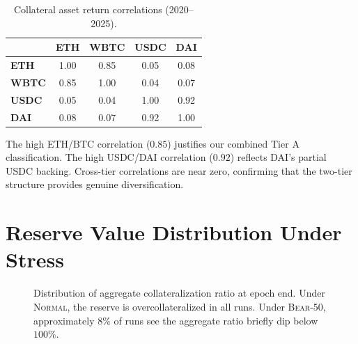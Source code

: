 \documentclass[11pt,a4paper]{article}
\begin{document}
\begin{table}[H]
\centering
\caption{Collateral asset return correlations (2020--2025).}
\label{tab:correlation}
\begin{tabular}{@{}lcccc@{}}
\toprule
         & \textbf{ETH} & \textbf{WBTC} & \textbf{USDC} & \textbf{DAI} \\
\midrule
\textbf{ETH}  & 1.00 & 0.85 & 0.05 & 0.08 \\
\textbf{WBTC} & 0.85 & 1.00 & 0.04 & 0.07 \\
\textbf{USDC} & 0.05 & 0.04 & 1.00 & 0.92 \\
\textbf{DAI}  & 0.08 & 0.07 & 0.92 & 1.00 \\
\bottomrule
\end{tabular}
\end{table}

The high ETH/BTC correlation ($0.85$) justifies our combined Tier A classification.
The high USDC/DAI correlation ($0.92$) reflects DAI's partial USDC backing.
Cross-tier correlations are near zero, confirming that the two-tier structure provides genuine diversification.

\section{Reserve Value Distribution Under Stress}
\label{app:reserve_dist}

\begin{figure}[H]
\centering
{}
\caption{Distribution of aggregate collateralization ratio at epoch end. Under \textsc{Normal}, the reserve is overcollateralized in all runs. Under \textsc{Bear-50}, approximately $8\%$ of runs see the aggregate ratio briefly dip below $100\%$.}
\label{fig:reserve_dist}
\end{figure}
\end{document}
